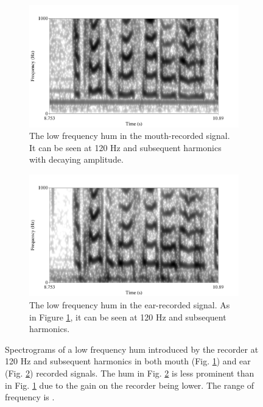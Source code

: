 \begin{figure}[h!]
\centering
\DIFdelbeginFL %
\DIFdelendFL \DIFaddbeginFL \begin{subfigure}{\textwidth}
  \DIFaddendFL \centering
  \includegraphics[width=1\linewidth]{figure/low_frequency_hum.png}
  \caption{The low frequency hum in the mouth-recorded signal.  It can be seen at 120 Hz and subsequent harmonics with decaying amplitude.}
  \label{fig:low_freq_hum-mouth}
\end{subfigure}%
\DIFdelbeginFL %
\DIFdelendFL %
\DIFaddbeginFL 

\begin{subfigure}{\textwidth}
  \DIFaddendFL \centering
  \includegraphics[width=1\linewidth]{figure/low_frequency_hum-ear.png}
  \caption{The low frequency hum in the ear-recorded signal. As in Figure \ref{fig:low_freq_hum-mouth}, it can be seen at 120 Hz and subsequent harmonics.}
  \label{fig:low_freq_hum-ear}
\end{subfigure}
\caption{Spectrograms of a low frequency hum introduced by the recorder at 120 Hz and subsequent harmonics in both mouth (Fig. \ref{fig:low_freq_hum-mouth}) and ear (Fig. \ref{fig:low_freq_hum-ear}) recorded signals. The hum in Fig. \ref{fig:low_freq_hum-ear} is less prominent than in Fig. \ref{fig:low_freq_hum-mouth} due to the gain on the recorder being lower.  The range of frequency is \DIFdelbeginFL {}\DIFdelendFL \DIFaddbeginFL {}\DIFaddendFL .}
\label{fig:low_freq_hum}
\end{figure}

